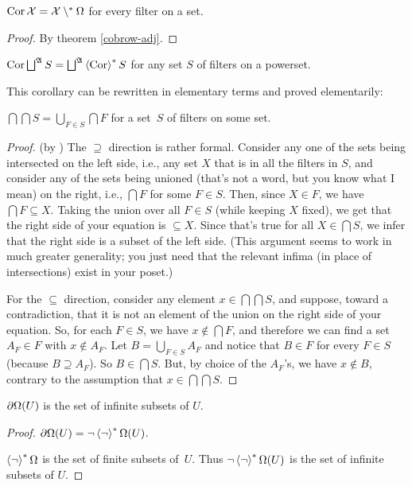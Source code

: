\begin{cor}
$\operatorname{Cor}\mathcal{X}=\mathcal{X}\setminus^{\ast}\Omega$ for every filter on
a set.\end{cor}
\begin{proof}
By theorem \ref{cobrow-adj}.\end{proof}
\begin{cor}
$\operatorname{Cor}\bigsqcup^{\mathfrak{A}}S=\bigsqcup^{\mathfrak{A}}\left\langle \operatorname{Cor}\right\rangle ^{\ast}S$
for any set $S$ of filters on a powerset.
\end{cor}
This corollary can be rewritten in elementary terms and proved elementarily:
\begin{prop}
$\bigcap\bigcap S=\bigcup_{F\in S}\bigcap F$ for a set~$S$ of filters
on some set.\end{prop}
\begin{proof}
(by ) The $\supseteq$ direction is rather formal.
Consider any one of the sets being intersected on the left side, i.e.,
any set $X$ that is in all the filters in $S$, and consider any
of the sets being unioned (that's not a word, but you know what I
mean) on the right, i.e., $\bigcap F$ for some $F\in S$. Then, since
$X\in F$, we have $\bigcap F\subseteq X$. Taking the union over
all $F\in S$ (while keeping $X$ fixed), we get that the right side
of your equation is $\subseteq X$. Since that's true for all $X\in\bigcap S$,
we infer that the right side is a subset of the left side. (This argument
seems to work in much greater generality; you just need that the relevant
infima (in place of intersections) exist in your poset.)

For the $\subseteq$ direction, consider any element $x\in\bigcap\bigcap S$,
and suppose, toward a contradiction, that it is not an element of
the union on the right side of your equation. So, for each $F\in S$,
we have $x\notin\bigcap F$, and therefore we can find a set $A_{F}\in F$
with $x\notin A_{F}$. Let $B=\bigcup_{F\in S}A_{F}$ and notice that
$B\in F$ for every $F\in S$ (because $B\supseteq A_{F}$). So $B\in\bigcap S$.
But, by choice of the $A_{F}$'s, we have $x\notin B$, contrary to
the assumption that $x\in\bigcap\bigcap S$.\end{proof}
\begin{prop}
$\partial\Omega(U)$ is the set of infinite subsets of $U$.\end{prop}
\begin{proof}
$\partial\Omega(U)=\lnot\left\langle \lnot\right\rangle ^{\ast}\Omega(U)$.

$\left\langle \lnot\right\rangle ^{\ast}\Omega$ is the set of finite subsets of~$U$. Thus
$\lnot\left\langle \lnot\right\rangle ^{\ast}\Omega(U)$ is the set of infinite subsets of
$U$.
\end{proof}

